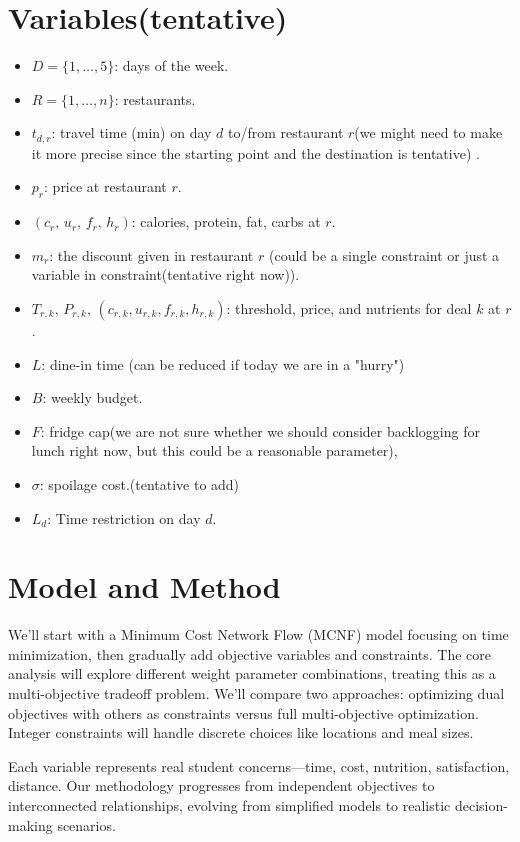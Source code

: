 \documentclass{article}
\begin{document}
\section{Variables(tentative)}
\begin{itemize}[left=0pt]
  \item $D=\{1,\dots,5\}$: days of the week.
  \item $R=\{1,\dots,n\}$: restaurants.
  \item $t_{d,r}$: travel time (min) on day $d$ to/from restaurant $r$(we might need to make it more precise since the starting point and the destination is tentative) .
  \item $p_r$: price at restaurant $r$.
  \item $(c_r,\,u_r,\,f_r,\,h_r)$: calories, protein, fat, carbs at $r$.
  \item $m_r$: the discount given in restaurant $r$ (could be a single constraint or just a variable in constraint(tentative right now)).
  \item $T_{r,k},\,P_{r,k},\,(c_{r,k},u_{r,k},f_{r,k},h_{r,k})$: threshold, price, and nutrients for deal $k$ at $r$.
  \item $L$: dine-in time (can be reduced if today we are in a "hurry") \item $B$: weekly budget. 
  \item $F$: fridge cap(we are not sure whether we should consider backlogging for lunch right now, but this could be a reasonable parameter), 
  \item $\sigma$: spoilage cost.(tentative to add)
  \item $L_d$: Time restriction on day $d$.
\end{itemize}

\section{Model and Method }

We'll start with a Minimum Cost Network Flow (MCNF) model focusing on time minimization, then gradually add objective variables and constraints. The core analysis will explore different weight parameter combinations, treating this as a multi-objective tradeoff problem. We'll compare two approaches: optimizing dual objectives with others as constraints versus full multi-objective optimization. Integer constraints will handle discrete choices like locations and meal sizes.

Each variable represents real student concerns—time, cost, nutrition, satisfaction, distance. Our methodology progresses from independent objectives to interconnected relationships, evolving from simplified models to realistic decision-making scenarios.
\end{document}
